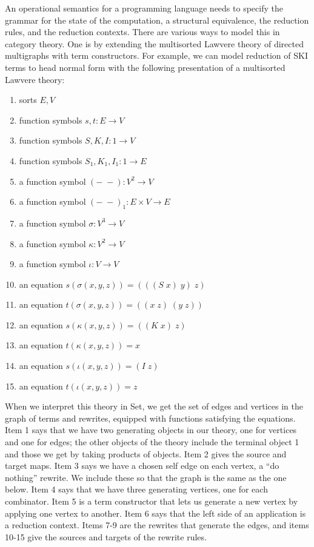 \documentclass[sigplan,9pt,review,anonymous]{acmart}\settopmatter{printfolios=true,printccs=false,printacmref=false}
\newcommand{\maps}{\colon}
\begin{document}
An operational semantics for a programming language needs to specify the grammar for the state of the computation, a structural equivalence, the reduction rules, and the reduction contexts.  There are various ways to model this in category theory.  One is by extending the multisorted Lawvere theory \cite{Trimble} of directed multigraphs with term constructors.  For example, we can model reduction of SKI terms to head normal form with the following presentation of a multisorted Lawvere theory:
\begin{enumerate}
  \item sorts $E, V$
  \item function symbols $s, t\maps E \to V$
  \item function symbols $S,K,I\maps 1 \to V$
  \item function symbols $S_1,K_1,I_1\maps 1 \to E$
  \item a function symbol $(-\;-)\maps V^2 \to V$
  \item a function symbol $(-\;-)_1\maps E\times V \to E$
  \item a function symbol $\sigma\maps V^3 \to V$
  \item a function symbol $\kappa\maps V^2 \to V$
  \item a function symbol $\iota\maps V\to V$
  \item an equation $s(\sigma(x,y,z)) = (((S\; x)\; y)\; z)$
  \item an equation $t(\sigma(x,y,z)) = ((x\; z)\;(y\; z))$
  \item an equation $s(\kappa(x,y,z)) = ((K\; x)\; z)$
  \item an equation $t(\kappa(x,y,z)) = x$
  \item an equation $s(\iota (x,y,z)) = (I\; z)$
  \item an equation $t(\iota (x,y,z)) = z$
\end{enumerate}
When we interpret this theory in Set, we get the set of edges and vertices in the graph of terms and rewrites, equipped with functions satisfying the equations.  Item 1 says that we have two generating objects in our theory, one for vertices and one for edges; the other objects of the theory include the terminal object 1 and those we get by taking products of objects.  Item 2 gives the source and target maps.  Item 3 says we have a chosen self edge on each vertex, a ``do nothing'' rewrite.  We include these so that the graph is the same as the one below.  Item 4 says that we have three generating vertices, one for each combinator.  Item 5 is a term constructor that lets us generate a new vertex by applying one vertex to another.  Item 6 says that the left side of an application is a reduction context.  Items 7-9 are the rewrites that generate the edges, and items 10-15 give the sources and targets of the rewrite rules.
\end{document}
